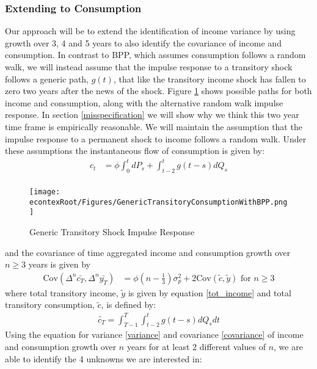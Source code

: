 \documentclass[titlepage]{\econtex}\newcommand{\texname}{IncomeUncertainty}
\begin{document}
\subsubsection{Extending \cite{carroll_nature_1997} to Consumption}
Our approach will be to extend the identification of income variance by using growth over 3, 4 and 5 years to also identify the covariance of income and consumption. In contrast to BPP, which assumes consumption follows a random walk, we will instead assume that the impulse response to a transitory shock follows a generic path, $g(t)$, that like the transitory income shock has fallen to zero two years after the news of the shock. Figure \ref{fig:GenericTransitoryBPP} shows possible paths for both income and consumption, along with the alternative random walk impulse response. In section \ref{misspecification} we will show why we think this two year time frame is empirically reasonable. We will maintain the assumption that the impulse response to a permanent shock to income follows a random walk. Under these assumptions the instantaneous flow of consumption is given by:
	\begin{align*}
c_t  &= \phi \int_{0}^{t}dP_s  + \int_{t-2}^{t} g(t-s)dQ_s  \\
\end{align*}
	\begin{figure} 
	\begin{centering}
		\texttt{[image: \\econtexRoot/Figures/GenericTransitoryConsumptionWithBPP.png]} 
		\caption{Generic Transitory Shock Impulse Response}
		\label{fig:GenericTransitoryBPP}
	\end{centering}
\end{figure}
and the covariance of time aggregated income and consumption growth over $n \geq 3$ years is given by
	\begin{align}
\mathrm{Cov}(\Delta^n \bar{c_T},\Delta^n \bar{y_T} ) &= \phi (n-\frac{1}{3}) \sigma^2_p + 2 \mathrm{Cov}(\tilde{c},\tilde{y}) \text{  for  } n\geq 3 \label{covariance}
\end{align}
where total transitory income, $\tilde{y}$ is given by equation \ref{tot_income} and total transitory consumption, $\tilde{c}$, is defined by:
\begin{align}
\tilde{c_T} = \int_{T-1}^{T}\int_{t-2}^{t} g(t-s)dQ_s dt \label{tot_cons}
\end{align}
Using the equation for variance \ref{variance} and covariance \ref{covariance} of income and consumption growth over $n$ years for at least 2 different values of $n$, we are able to identify the 4 unknowns we are interested in:
\end{document}
